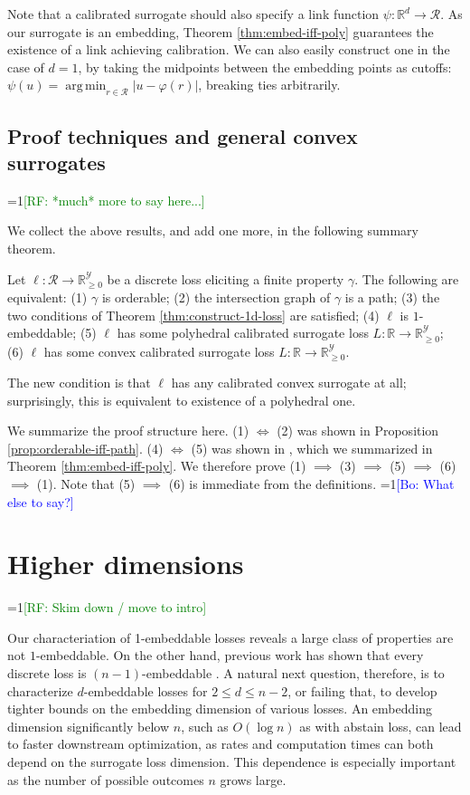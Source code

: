 \documentclass[anon]{colt2020} %
\newcommand{\Comments}{1}
\newcommand{\mynote}[2]{\ifnum\Comments=1\textcolor{#1}{#2}\fi}
\newcommand{\raf}[1]{\mynote{green}{[RF: #1]}}
\newcommand{\bo}[1]{\mynote{blue}{[Bo: #1]}}
\newcommand{\reals}{\mathbb{R}}
\newcommand{\nonnegreals}{\reals_{\geq 0}}%
\newcommand{\R}{\mathcal{R}}
\newcommand{\Y}{\mathcal{Y}}
\DeclareMathOperator*{\argmin}{arg\,min}
\begin{document}
Note that a calibrated surrogate should also specify a link function $\psi: \reals^d \to \R$.
As our surrogate is an embedding, Theorem \ref{thm:embed-iff-poly} guarantees the existence of a link achieving calibration.
We can also easily construct one in the case of $d=1$, by taking the midpoints between the embedding points as cutoffs: $\psi(u) = \argmin_{r \in \R} |u - \varphi(r)|$, breaking ties arbitrarily.

\subsection{Proof techniques and general convex surrogates}
\label{sec:1d-proof-discuss}

\raf{*much* more to say here...}

We collect the above results, and add one more, in the following summary theorem.
\begin{theorem} \label{thm:1d-tfae}
  Let $\ell: \R \to \nonnegreals^{\Y}$ be a discrete loss eliciting a finite property $\gamma$.
  The following are equivalent: (1) $\gamma$ is orderable; (2) the intersection graph of $\gamma$ is a path; (3) the two conditions of Theorem \ref{thm:construct-1d-loss} are satisfied; (4) $\ell$ is $1$-embeddable; (5) $\ell$ has some polyhedral calibrated surrogate loss $L: \reals \to \nonnegreals^{\Y}$; (6) $\ell$ has some convex calibrated surrogate loss $L: \reals \to \nonnegreals^{\Y}$.
\end{theorem}
The new condition is that $\ell$ has any calibrated convex surrogate at all; surprisingly, this is equivalent to existence of a polyhedral one.

We summarize the proof structure here.
(1) $\iff$ (2) was shown in Proposition \ref{prop:orderable-iff-path}.
(4) $\iff$ (5) was shown in \cite{finocchiaro2019embedding}, which we summarized in Theorem \ref{thm:embed-iff-poly}.
We therefore prove (1) $\implies$ (3) $\implies$ (5) $\implies$ (6) $\implies$ (1).
Note that (5) $\implies$ (6) is immediate from the definitions.
\bo{What else to say?}


\section{Higher dimensions}\label{sec:d-dim}

\raf{Skim down / move to intro}

Our characteriation of 1-embeddable losses reveals a large class of properties are not $1$-embeddable.
On the other hand, previous work has shown that every discrete loss is $(n-1)$-embeddable
\citep{finocchiaro2019embedding}.
A natural next question, therefore, is to characterize $d$-embeddable losses for $2 \leq d \leq n-2$, or failing that, to develop tighter bounds on the embedding dimension of various losses.
An embedding dimension significantly below $n$, such as $O(\log n)$ as with abstain loss, can lead to faster downstream optimization, as rates and computation times can both depend on the surrogate loss dimension.
This dependence is especially important as the number of possible outcomes $n$ grows large.
\end{document}
